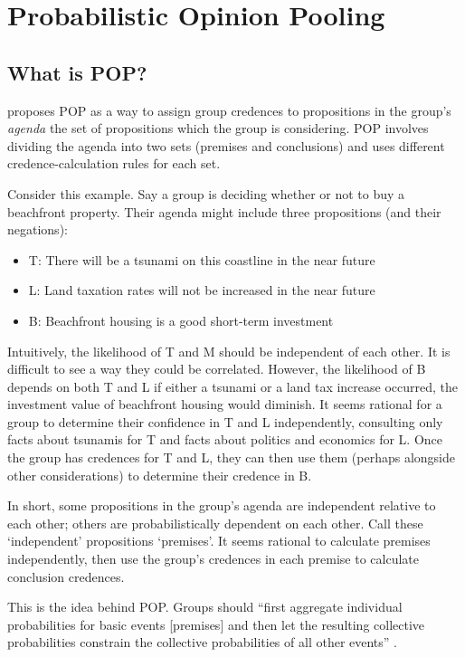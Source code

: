 \documentclass{article}
\begin{document}
\section{Probabilistic Opinion Pooling}

\subsection{What is POP?}

\citet{dietrich2013probabilistic} proposes POP as a way to assign group credences to propositions in the group's \textit{agenda} \textemdash{} the set of propositions which the group is considering. POP involves dividing the agenda into two sets (premises and conclusions) and uses different credence-calculation rules for each set. 

Consider this example. Say a group is deciding whether or not to buy a beachfront property. Their agenda might include three propositions (and their negations):

\begin{itemize}
	\item T: There will be a tsunami on this coastline in the near future
	\item L: Land taxation rates will not be increased in the near future
	\item B: Beachfront housing is a good short-term investment
\end{itemize}

\noindent
Intuitively, the likelihood of T and M should be independent of each other. It is difficult to see a way they could be correlated. However, the likelihood of B depends on both T and L \textemdash{} if either a tsunami or a land tax increase occurred, the investment value of beachfront housing would diminish. It seems rational for a group to determine their confidence in T and L independently, consulting only facts about tsunamis for T and facts about politics and economics for L. Once the group has credences for T and L, they can then use them (perhaps alongside other considerations) to determine their credence in B. 

In short, some propositions in the group's agenda are independent relative to each other; others are probabilistically dependent on each other. Call these `independent' propositions `premises'. It seems rational to calculate premises independently, then use the group's credences in each premise to calculate conclusion credences.

This is the idea behind POP. Groups should ``first aggregate individual probabilities for basic events [premises] and then let the resulting collective probabilities constrain the collective probabilities of all other events'' \citep[pg. 6]{dietrich2013probabilistic}. 
\end{document}
